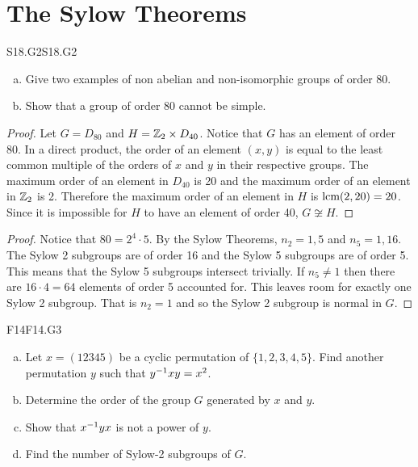 \documentclass[../AlgebraQualSolutions.tex]{subfiles}
\begin{document}
\section{The Sylow Theorems}

	\begin{prob}{S18.G2}{S18.G2}
		\begin{enumerate}[(a)]
			\item Give two examples of non abelian and non-isomorphic groups of order 80.
			\item Show that a group of order 80 cannot be simple.
		\end{enumerate}
	\end{prob}

	\begin{proof}
		Let $G = D_{80}$ and $H = \mathbb{Z}_2 \times D_{40}$. Notice that $G$ has an element of order 80. In a direct product, the order of an element $(x,y)$ is equal to the least common multiple of the orders of $x$ and $y$ in their respective groups. The maximum order of an element in $D_{40}$ is 20 and the maximum order of an element in $\mathbb{Z}_2$ is 2. Therefore the maximum order of an element in $H$ is $\textrm{lcm}(2,20) = 20$. Since it is impossible for $H$ to have an element of order 40, $G \not\cong H$.
	\end{proof}

	\begin{proof}
		Notice that $80 = 2^4 \cdot 5$. By the Sylow Theorems, $n_2 = 1, 5$ and $n_5 = 1,16$. The Sylow 2 subgroups are of order 16 and the Sylow 5 subgroups are of order 5. This means that the Sylow 5 subgroups intersect trivially. If $n_5 \neq 1$ then there are $16 \cdot 4 = 64$ elements of order 5 accounted for. This leaves room for exactly one Sylow 2 subgroup. That is $n_2 = 1$ and so the Sylow 2 subgroup is normal in $G$.
	\end{proof}

	\begin{prob}{F14}{F14.G3}
		\begin{enumerate}[(a)]
			\item Let $x = (12345)$ be a cyclic permutation of $\{1,2,3,4,5\}$. Find another permutation $y$ such that $y^{-1} xy = x^2$.
			\item Determine the order of the group $G$ generated by $x$ and $y$.
			\item Show that $x^{-1} y x$ is not a power of $y$.
			\item Find the number of Sylow-2 subgroups of $G$.
		\end{enumerate}
	\end{prob}
\end{document}
